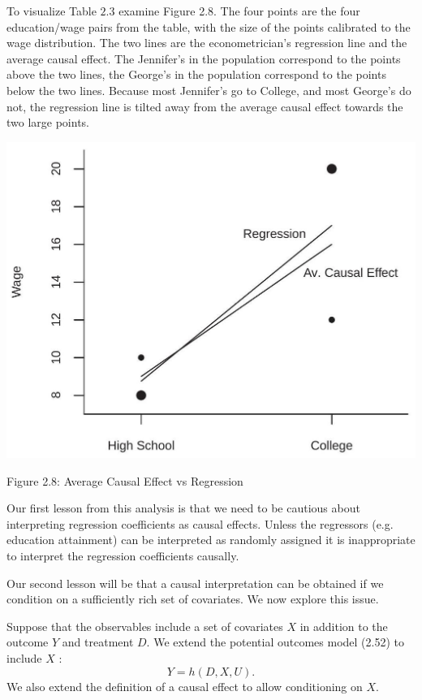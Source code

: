 \documentclass[10pt]{article}
\begin{document}
To visualize Table $2.3$ examine Figure 2.8. The four points are the four education/wage pairs from the table, with the size of the points calibrated to the wage distribution. The two lines are the econometrician's regression line and the average causal effect. The Jennifer's in the population correspond to the points above the two lines, the George's in the population correspond to the points below the two lines. Because most Jennifer's go to College, and most George's do not, the regression line is tilted away from the average causal effect towards the two large points.

\includegraphics[max width=\textwidth]{2022_09_17_efa0deee3441d06e0b66g-40}

Figure 2.8: Average Causal Effect vs Regression

Our first lesson from this analysis is that we need to be cautious about interpreting regression coefficients as causal effects. Unless the regressors (e.g. education attainment) can be interpreted as randomly assigned it is inappropriate to interpret the regression coefficients causally.

Our second lesson will be that a causal interpretation can be obtained if we condition on a sufficiently rich set of covariates. We now explore this issue.

Suppose that the observables include a set of covariates $X$ in addition to the outcome $Y$ and treatment $D$. We extend the potential outcomes model (2.52) to include $X$ :
$$
Y=h(D, X, U) .
$$
We also extend the definition of a causal effect to allow conditioning on $X$.
\end{document}
